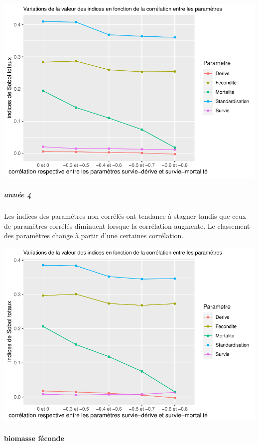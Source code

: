 \documentclass[
]{article}
\begin{document}
\includegraphics{rapport_files/figure-latex/zprtygsbte-1.pdf}

\hypertarget{annuxe9e-4-2}{%
\subparagraph{année 4}\label{annuxe9e-4-2}}

Les indices des paramètres non corrélés ont tendance à stagner tandis
que ceux de paramètres corrélés diminuent lorsque la corrélation
augmente. Le classement des paramètres change à partir d'une certaines
corrélation.

\includegraphics{rapport_files/figure-latex/prtygsbtea-1.pdf}

\hypertarget{biomasse-fuxe9conde-3}{%
\paragraph{biomasse féconde}\label{biomasse-fuxe9conde-3}}
\end{document}

